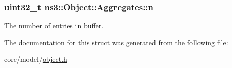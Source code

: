 \subsubsection[{\texorpdfstring{n}{n}}]{\setlength{\rightskip}{0pt plus 5cm}uint32\+\_\+t ns3\+::\+Object\+::\+Aggregates\+::n}\hypertarget{structns3_1_1Object_1_1Aggregates_a3157f15eafcbf5f0ec5c85d390853829}{}\label{structns3_1_1Object_1_1Aggregates_a3157f15eafcbf5f0ec5c85d390853829}
The number of entries in {\ttfamily buffer}. 

The documentation for this struct was generated from the following file\+:\begin{DoxyCompactItemize}
\item 
core/model/\hyperlink{object_8h}{object.\+h}\end{DoxyCompactItemize}
